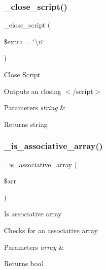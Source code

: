 \subsubsection{\texorpdfstring{\+\_\+close\+\_\+script()}{\_close\_script()}}
{\footnotesize\ttfamily \+\_\+close\+\_\+script (\begin{DoxyParamCaption}\item[{}]{\$extra = {\ttfamily \char`\"{}\textbackslash{}n\char`\"{}} }\end{DoxyParamCaption})\hspace{0.3cm}{\ttfamily [protected]}}

Close Script

Outputs an closing $<$/script$>$


\begin{DoxyParams}{Parameters}
{\em string} & \\
\hline
\end{DoxyParams}
\begin{DoxyReturn}{Returns}
string 
\end{DoxyReturn}
\mbox{\label{class_c_i___javascript_aa37c9b1b7e2898fe21a0deaace09b156}} 
\subsubsection{\texorpdfstring{\+\_\+is\+\_\+associative\+\_\+array()}{\_is\_associative\_array()}}
{\footnotesize\ttfamily \+\_\+is\+\_\+associative\+\_\+array (\begin{DoxyParamCaption}\item[{}]{\$arr }\end{DoxyParamCaption})\hspace{0.3cm}{\ttfamily [protected]}}

Is associative array

Checks for an associative array


\begin{DoxyParams}{Parameters}
{\em array} & \\
\hline
\end{DoxyParams}
\begin{DoxyReturn}{Returns}
bool 
\end{DoxyReturn}
\mbox{\label{class_c_i___javascript_ab90b7bf672ff305aa302ced7c8255762}} 
